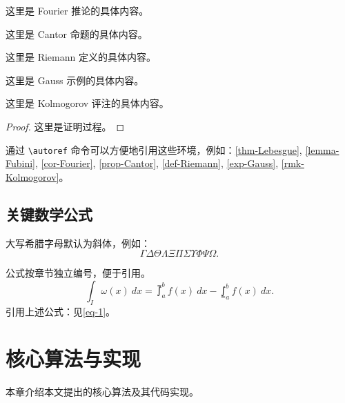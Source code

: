 \documentclass{sysuthesis}
\begin{document}
\begin{corollary}[Fourier] \label{cor-Fourier}
  这里是 Fourier 推论的具体内容。
\end{corollary}

\begin{proposition}[Cantor] \label{prop-Cantor}
  这里是 Cantor 命题的具体内容。
\end{proposition}

\begin{definition}[Riemann] \label{def-Riemann}
  这里是 Riemann 定义的具体内容。
\end{definition}

\begin{example}[Gauss] \label{exp-Gauss}
  这里是 Gauss 示例的具体内容。
\end{example}

\begin{remark}[Kolmogorov] \label{rmk-Kolmogorov}
  这里是 Kolmogorov 评注的具体内容。
\end{remark}

\begin{proof}
  这里是证明过程。
\end{proof}

通过 \verb|\autoref| 命令可以方便地引用这些环境，例如：\autoref{thm-Lebesgue}, \autoref{lemma-Fubini}, \autoref{cor-Fourier}, \autoref{prop-Cantor}, \autoref{def-Riemann}, \autoref{exp-Gauss}, \autoref{rmk-Kolmogorov}。

\section{关键数学公式}

大写希腊字母默认为斜体，例如：
\begin{equation*}
  \Gamma \Delta \Theta \Lambda \Xi \Pi \Sigma \Upsilon \Phi \Psi \Omega.
\end{equation*}

公式按章节独立编号，便于引用。
\begin{equation} \label{eq-1}
  \int_I \omega(x)\ dx = \upint_{a}^b f(x)\ dx - \lowint_a^b f(x)\ dx.
\end{equation}
引用上述公式：见\autoref{eq-1}。

\chapter{核心算法与实现}

本章介绍本文提出的核心算法及其代码实现。
\end{document}
